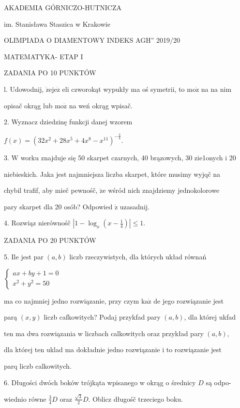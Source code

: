 \documentclass[a4paper,12pt]{article}
\begin{document}
AKADEMIA GÓRNICZO-HUTNICZA

im. Stanisława Staszica w Krakowie

OLIMPIADA O DIAMENTOWY INDEKS AGH'' 2019/20

MATEMATYKA- ETAP I

ZADANIA PO 10 PUNKTÓW

l. Udowodnij, $\dot{\mathrm{z}}\mathrm{e}\mathrm{j}\mathrm{e}\dot{\mathrm{z}}$ eli czworokąt wypukły ma oś symetrii, to $\mathrm{m}\mathrm{o}\dot{\mathrm{z}}$ na na nim

opisač okrąg lub $\mathrm{m}\mathrm{o}\dot{\mathrm{z}}$ na weń okrąg wpisač.

2. Wyznacz dziedzinę funkcji danej wzorem

$f(x)=(32x^{2}+28x^{5}+4x^{8}-x^{11})^{-\frac{3}{4}}.$

3. $\mathrm{W}$ worku znajduje się 50 skarpet czarnych, 40 brązowych, 30 zie1onych i 20

niebieskich. Jaka jest najmniejsza liczba skarpet, które musimy wyjqč na

chybil trafif, aby mieč pewnośč, $\dot{\mathrm{z}}\mathrm{e}$ wśród nich znajdziemy jednokolorowe

pary skarpet dla 20 osób? Odpowied $\acute{\mathrm{z}}$ uzasadnij.

4. Rozwiąz nierównośč $|1-\displaystyle \log_{x}(x-\frac{1}{4})|\leq 1.$

ZADANIA PO 20 PUNKTÓW

5. Ile jest par $(a,b)$ liczb rzeczywistych, dla których układ równań

$\left\{\begin{array}{l}
ax+by+1=0\\
x^{2}+y^{2}=50
\end{array}\right.$

ma co najmniej jedno rozwiązanie, przy czym $\mathrm{k}\mathrm{a}\dot{\mathrm{z}}$ de jego rozwiązanie jest

parą $(x,y)$ liczb cafkowitych? Podaj przykfad pary $(a,b)$, dla której ukfad

ten ma dwa rozwiązania w liczbach calkowitych oraz przykład pary $(a,b),$

dla której ten uklad ma dokładnie jedno rozwiązanie i to rozwiązanie jest

parq liczb calkowitych.

6. Długości dwóch boków trójkąta wpisanego w okrąg o średnicy $D$ są odpo-

wiednio równe $\displaystyle \frac{3}{4}D$ oraz $\displaystyle \frac{\sqrt{3}}{2}D$. Oblicz długośč trzeciego boku.
\end{document}

